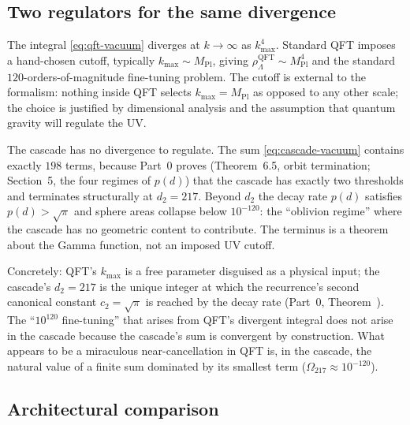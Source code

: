 \documentclass[11pt,a4paper]{article}
\begin{document}
\subsection{Two regulators for the same divergence}

The integral \eqref{eq:qft-vacuum} diverges at $k\to\infty$ as
$k_{\max}^4$. Standard QFT imposes a hand-chosen cutoff, typically
$k_{\max}\sim M_{\mathrm{Pl}}$, giving
$\rho_\Lambda^{\mathrm{QFT}}\sim M_{\mathrm{Pl}}^4$ and the standard
$120$-orders-of-magnitude fine-tuning problem. The cutoff is external
to the formalism: nothing inside QFT selects $k_{\max}=M_{\mathrm{Pl}}$
as opposed to any other scale; the choice is justified by dimensional
analysis and the assumption that quantum gravity will regulate the UV.

The cascade has no divergence to regulate. The sum
\eqref{eq:cascade-vacuum} contains exactly $198$ terms, because Part~0
proves (Theorem~6.5, orbit termination; Section~5, the four regimes of
$p(d)$) that the cascade has exactly two thresholds and terminates
structurally at $d_2 = 217$. Beyond $d_2$ the decay rate $p(d)$
satisfies $p(d)>\sqrt{\pi}$ and sphere areas collapse below
$10^{-120}$: the ``oblivion regime'' where the cascade has no
geometric content to contribute. The terminus is a theorem about the
Gamma function, not an imposed UV cutoff.

Concretely: QFT's $k_{\max}$ is a free parameter disguised as a
physical input; the cascade's $d_2 = 217$ is the unique integer at
which the recurrence's second canonical constant $c_2 = \sqrt{\pi}$ is
reached by the decay rate (Part~0, Theorem~). The ``$10^{120}$
fine-tuning'' that arises from QFT's divergent integral does not arise
in the cascade because the cascade's sum is convergent by construction.
What appears to be a miraculous near-cancellation in QFT is, in the
cascade, the natural value of a finite sum dominated by its smallest
term ($\Omega_{217}\approx 10^{-120}$).

\subsection{Architectural comparison}
\end{document}
